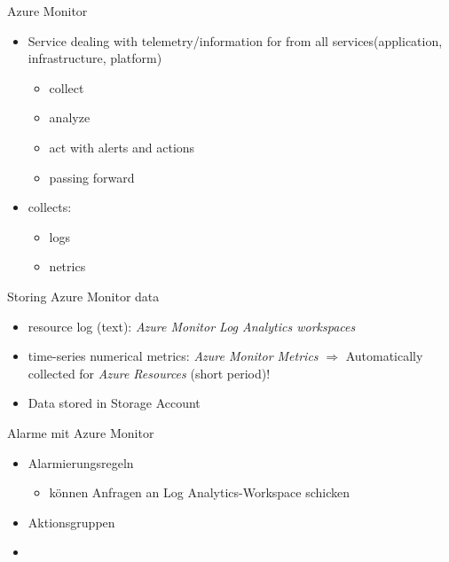 

\begin{flashcard}[Definition]{Azure Monitor}
  \begin{itemize}
    \item Service dealing with telemetry/information for from all services\newline (application, infrastructure, platform)
      \begin{itemize}
        \item collect
        \item analyze
        \item act with alerts and actions
        \item passing forward
      \end{itemize}
 
    \item collects:
      \begin{itemize}
        \item logs
        \item netrics
      \end{itemize}
  \end{itemize}
\end{flashcard}

\begin{flashcard}[Definition]{Storing Azure Monitor data}
  \begin{itemize}
    \item resource log (text): \emph{Azure Monitor Log Analytics workspaces}
    \item time-series numerical metrics: \emph{Azure Monitor Metrics}\newline
      $\Rightarrow$ Automatically collected for \emph{Azure Resources} (short period)!
    \item Data stored in Storage Account
  \end{itemize}
\end{flashcard}

\begin{flashcard}[Definition]{Alarme mit Azure Monitor}
  \begin{itemize}
    \item Alarmierungsregeln
      \begin{itemize}
        \item können Anfragen an Log Analytics-Workspace schicken
      \end{itemize}
    \item Aktionsgruppen
    \item 
  \end{itemize}
\end{flashcard}

